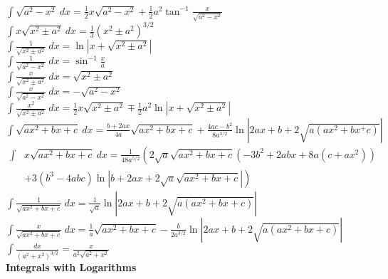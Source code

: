 \documentclass[10pt,landscape,a4paper]{article}
\begin{document}
\begin{multicols*}{3}
$
\int  \sqrt{a^2 - x^2}\ dx = \frac{1}{2} x \sqrt{a^2-x^2} 
+\frac{1}{2}a^2\tan^{-1}\frac{x}{\sqrt{a^2-x^2}}
$\\

$
\int  x \sqrt{x^2 \pm a^2}\ dx= \frac{1}{3}\left ( x^2 \pm a^2 \right)^{3/2} 
$\\

$
\int \frac{1}{\sqrt{x^2 \pm a^2}}\ dx = \ln \left | x + \sqrt{x^2 \pm a^2} \right | 
$\\

$
\int \frac{1}{\sqrt{a^2 - x^2}}\ dx = \sin^{-1}\frac{x}{a} 
$\\

$
\int \frac{x}{\sqrt{x^2\pm a^2}}\ dx = \sqrt{x^2 \pm a^2} 
$\\

$
\int \frac{x}{\sqrt{a^2-x^2}}\ dx = -\sqrt{a^2-x^2} 
$\\

$\label{eq:Russ}
\int \frac{x^2}{\sqrt{x^2 \pm a^2}}\ dx = \frac{1}{2}x\sqrt{x^2 \pm a^2}
\mp \frac{1}{2}a^2 \ln \left| x + \sqrt{x^2\pm a^2} \right | 
$\\

$\label{eq:Winokur1}
\int \sqrt{a x^2 + b x + c}\ dx = 
\frac{b+2ax}{4a}\sqrt{ax^2+bx+c}
+
\frac{4ac-b^2}{8a^{3/2}}\ln \left| 2ax + b + 2\sqrt{a(ax^2+bx^+c)}\right |
$\\

$\label{eq:Larry-Morris}\begin{array}{ll}
\int &x \sqrt{a x^2 + bx + c}\ dx = \frac{1}{48a^{5/2}}\left ( 
2 \sqrt{a} \sqrt{ax^2+bx+c}
\right .  
  \left( - 3b^2 + 2 abx + 8 a(c+ax^2) \right)
\\ &  \left.
 + 3(b^3-4abc)\ln \left|b + 2ax + 2\sqrt{a}\sqrt{ax^2+bx+c} \right| \right)
 \end{array}
$\\

$
\int\frac{1}{\sqrt{ax^2+bx+c}}\ dx=
\frac{1}{\sqrt{a}}\ln \left| 2ax+b + 2 \sqrt{a(ax^2+bx+c)} \right | 
$\\

$\label{eq:Duley}
\int \frac{x}{\sqrt{ax^2+bx+c}}\ dx=
\frac{1}{a}\sqrt{ax^2+bx + c} 
-
\frac{b}{2a^{3/2}}\ln \left| 2ax+b + 2 \sqrt{a(ax^2+bx+c)} \right |
$\\

$\label{eq:Winokur2}
\int\frac{dx}{(a^2+x^2)^{3/2}}=\frac{x}{a^2\sqrt{a^2+x^2}}
$\\



\textbf{Integrals with Logarithms}


\end{multicols*}
\end{document}
